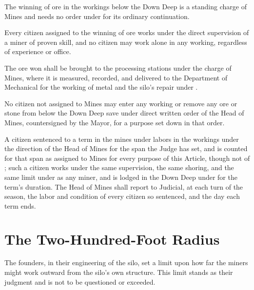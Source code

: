 \begin{clauses}
\item The winning of ore in the workings below the Down Deep is a standing charge of Mines and needs no order under  for its ordinary continuation.
\item Every citizen assigned to the winning of ore works under the direct supervision of a miner of proven skill, and no citizen may work alone in any working, regardless of experience or office.
\item The ore won shall be brought to the processing stations under the charge of Mines, where it is measured, recorded, and delivered to the Department of Mechanical for the working of metal and the silo's repair under .
\item No citizen not assigned to Mines may enter any working or remove any ore or stone from below the Down Deep save under direct written order of the Head of Mines, countersigned by the Mayor, for a purpose set down in that order.
\item A citizen sentenced to a term in the mines under  labors in the workings under the direction of the Head of Mines for the span the Judge has set, and is counted for that span as assigned to Mines for every purpose of this Article, though not of ; such a citizen works under the same supervision, the same shoring, and the same limit under  as any miner, and is lodged in the Down Deep under  for the term's duration. The Head of Mines shall report to Judicial, at each turn of the season, the labor and condition of every citizen so sentenced, and the day each term ends.
\end{clauses}

\section{The Two-Hundred-Foot Radius}
\label{sec:mines:two-hundred-foot-radius}

The founders, in their engineering of the silo, set a limit upon how far the miners might work outward from the silo's own structure. This limit stands as their judgment and is not to be questioned or exceeded.

